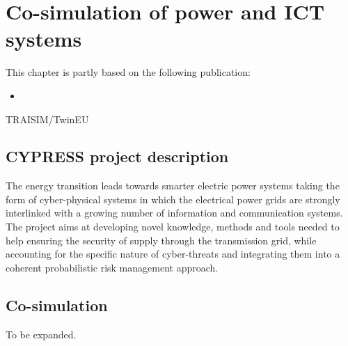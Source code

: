 \chapter{Co-simulation of power and ICT systems}
\label{ch:cosim}
\minitoc

\begin{tcolorbox}[width=\linewidth, sharp corners=all,
    colback=white!80!black,
    colframe=white!80!black]
This chapter is partly based on the following publication:
\begin{itemize}
    \item {}
\end{itemize}
\end{tcolorbox}


TRAISIM/TwinEU

\section{CYPRESS project description}

The energy transition leads towards smarter electric power systems taking the form of cyber-physical systems in which the electrical power grids are strongly interlinked with a growing number of information and communication systems. The project aims at developing novel knowledge, methods and tools needed to help ensuring the security of supply through the transmission grid, while accounting for the specific nature of cyber-threats and integrating them into a coherent probabilistic risk management approach.

\section{Co-simulation}

To be expanded.



